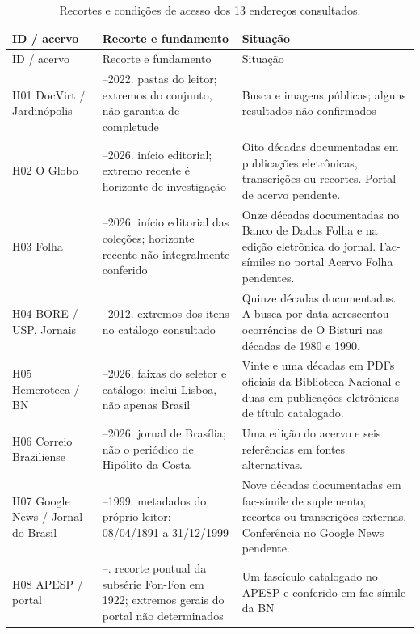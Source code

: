 \small\begin{longtable}{>{\raggedright\arraybackslash}p{}>{\raggedright\arraybackslash}p{}>{\raggedright\arraybackslash}p{}}
\caption{Recortes e condições de acesso dos 13 endereços consultados.}\\
\toprule ID / acervo & Recorte e fundamento & Situação\\\midrule\endfirsthead
\toprule ID / acervo & Recorte e fundamento & Situação\\\midrule\endhead
H01 DocVirt / Jardinópolis & 1926--2022. pastas do leitor; extremos do conjunto, não garantia de completude & Busca e imagens públicas; alguns resultados não confirmados \cite{r3archiveH01} \\
H02 O Globo & 1925--2026. início editorial; extremo recente é horizonte de investigação & Oito décadas documentadas em publicações eletrônicas, transcrições ou recortes. Portal de acervo pendente. \cite{r3archiveH02} \\
H03 Folha & 1921--2026. início editorial das coleções; horizonte recente não integralmente conferido & Onze décadas documentadas no Banco de Dados Folha e na edição eletrônica do jornal. Fac-símiles no portal Acervo Folha pendentes. \cite{r3archiveH03} \\
H04 BORE / USP, Jornais & 1873--2012. extremos dos itens no catálogo consultado & Quinze décadas documentadas. A busca por data acrescentou ocorrências de O Bisturi nas décadas de 1980 e 1990. \cite{r3archiveH04} \\
H05 Hemeroteca / BN & 1741--2026. faixas do seletor e catálogo; inclui Lisboa, não apenas Brasil & Vinte e uma décadas em PDFs oficiais da Biblioteca Nacional e duas em publicações eletrônicas de título catalogado. \cite{r3archiveH05} \\
H06 Correio Braziliense & 1960--2026. jornal de Brasília; não o periódico de Hipólito da Costa & Uma edição do acervo e seis referências em fontes alternativas. \cite{r3archiveH06} \\
H07 Google News / Jornal do Brasil & 1891--1999. metadados do próprio leitor: 08/04/1891 a 31/12/1999 & Nove décadas documentadas em fac-símile de suplemento, recortes ou transcrições externas. Conferência no Google News pendente. \cite{r3archiveH07} \\
H08 APESP / portal & --. recorte pontual da subsérie Fon-Fon em 1922; extremos gerais do portal não determinados & Um fascículo catalogado no APESP e conferido em fac-símile da BN \cite{r3archiveH08} \\

\end{longtable}
